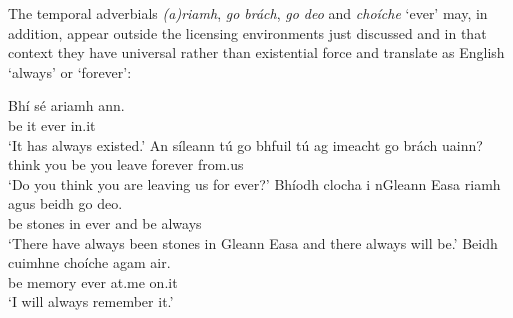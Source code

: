 \documentclass[output=paper,colorlinks,citecolor=brown]{langscibook}
\begin{document}

The temporal adverbials \textit{(a)riamh}, {\itshape go brách}, {\itshape go deo} and {\itshape choíche} `ever' may, in addition, appear outside the licensing environments just discussed and in that context they have universal rather than existential force and translate as English `always' or `forever': 

\ea\label{ex:ever}
\ea
\gll Bhí sé ariamh ann. \\
     {be\past} it ever in.it \\
\glt `It has always existed.'
\ex
\gll An síleann tú go bhfuil tú ag imeacht {go brách} uainn? \\
     {\interr} {think\pres} you {\go} {be\pres} you {\prog} {leave\vn} forever {from.us}\\
\glt `Do you think you are leaving us for ever?'
\ex
\gll Bhíodh clocha i nGleann Easa riamh agus beidh {go deo}. \\
     {be\pasthabit} stones in {} {} ever and {be\fut} always\\
\glt `There have always been stones in Gleann Easa and there always will be.'
\ex
\gll Beidh cuimhne choíche agam air. \\
    {be\fut} memory ever at.me on.it\\
\glt `I will always remember it.'
\z
\z

\end{document}
